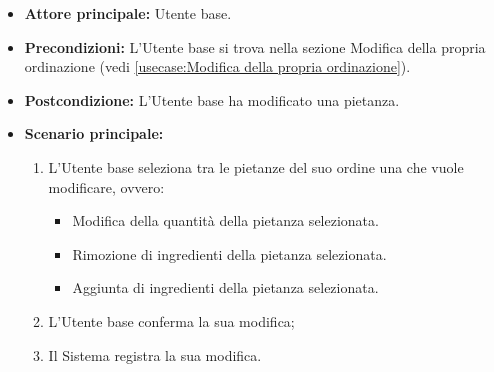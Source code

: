 \label{usecase:Modifica pietanza}
\begin{itemize}
	\item \textbf{Attore principale:} Utente base.

	\item \textbf{Precondizioni:}  L'Utente base si trova nella sezione Modifica della propria ordinazione (vedi \autoref{usecase:Modifica della propria ordinazione}).


	\item \textbf{Postcondizione:} L'Utente base ha modificato una pietanza.

	\item \textbf{Scenario principale:}
	      \begin{enumerate}
		      \item L'Utente base seleziona tra le pietanze del suo ordine una che vuole modificare, ovvero:
		            \begin{itemize}
			            \item Modifica della quantità della pietanza selezionata.
			            \item Rimozione di ingredienti della pietanza selezionata.
			            \item Aggiunta di ingredienti della pietanza selezionata.
		            \end{itemize}
		      \item L'Utente base conferma la sua modifica;
		      \item Il Sistema registra la sua modifica.
	      \end{enumerate}
\end{itemize}
